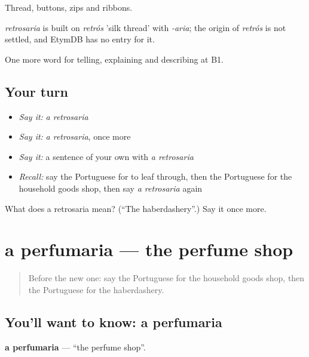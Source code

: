 Thread, buttons, zips and ribbons.

\begin{cousinweb}
\emph{retrosaria} is built on \emph{retrós} 'silk thread' with \emph{-aria}; the origin of \emph{retrós} is not settled, and EtymDB has no entry for it.
\end{cousinweb}

\begin{grammarlens}[title={What you've built}]
One more word for telling, explaining and describing at B1.
\end{grammarlens}

\subsection*{Your turn}
\begin{itemize}
\raggedright
  \item \emph{Say it:} \emph{a retrosaria}
  \item \emph{Say it:} \emph{a retrosaria}, once more
  \item \emph{Say it:} a sentence of your own with \emph{a retrosaria}
  \item \emph{Recall:} say the Portuguese for to leaf through, then the Portuguese for the household goods shop, then say \emph{a retrosaria} again
\end{itemize}

\begin{tcolorbox}[breakable,colback=teal!4,colframe=teal!35!black,title={Before you move on}]
What does a retrosaria mean? (\textquotedblleft{}The haberdashery\textquotedblright{}.) Say it once more.
\end{tcolorbox}
\section[a perfumaria]{a perfumaria — the perfume shop}

\label{lesson:PT-C449-perfumaria}



\begin{quote}
Before the new one: say the Portuguese for the household goods shop, then the Portuguese for the haberdashery.
\end{quote}

\subsection*{You'll want to know: a perfumaria}
\textbf{a perfumaria} — \textquotedblleft{}the perfume shop\textquotedblright{}.

